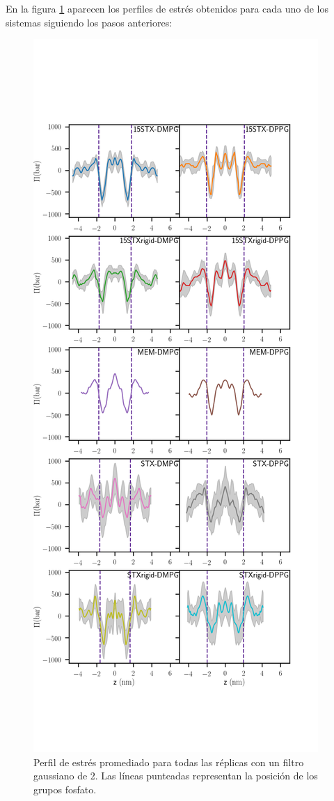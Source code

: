 \documentclass[12pt]{article}
\begin{document}
En la figura \ref{fig:stress2} aparecen los perfiles de estrés obtenidos para cada uno de los sistemas siguiendo los pasos anteriores:\\
\begin{figure}
\begin{center}
    \includegraphics[scale=0.25,trim={0 6cm 0 9cm},clip]{../Plots/stress_profile_2_sym.png}
  \caption{Perfil de estr\'{e}s promediado para todas las r\'{e}plicas con un filtro gaussiano de 2. Las l\'{i}neas punteadas representan la posici\'{o}n de los grupos fosfato. }
  \label{fig:stress2}
\end{center}
\end{figure}
\end{document}
